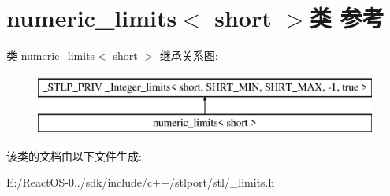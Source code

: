 \hypertarget{classnumeric__limits_3_01short_01_4}{}\section{numeric\+\_\+limits$<$ short $>$类 参考}
\label{classnumeric__limits_3_01short_01_4}
类 numeric\+\_\+limits$<$ short $>$ 继承关系图\+:\begin{figure}[H]
\begin{center}
\leavevmode
\includegraphics[height=2.000000cm]{classnumeric__limits_3_01short_01_4}
\end{center}
\end{figure}


该类的文档由以下文件生成\+:\begin{DoxyCompactItemize}
\item 
E\+:/\+React\+O\+S-\/0../sdk/include/c++/stlport/stl/\+\_\+limits.\+h\end{DoxyCompactItemize}
